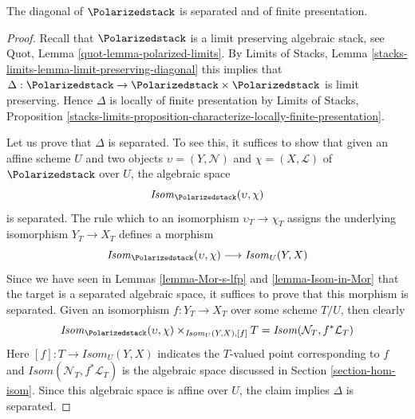 %
\begin{lemma}
\label{lemma-polarized-diagonal-separated-fp}
The diagonal of $\Polarizedstack$ is separated
and of finite presentation.
\end{lemma}

\begin{proof}
Recall that $\Polarizedstack$ is a limit preserving algebraic stack, see
Quot, Lemma \ref{quot-lemma-polarized-limits}.
By Limits of Stacks, Lemma \ref{stacks-limits-lemma-limit-preserving-diagonal}
this implies that
$\Delta : \Polarizedstack \to \Polarizedstack \times \Polarizedstack$
is limit preserving. Hence $\Delta$ is locally of finite presentation
by Limits of Stacks, Proposition
\ref{stacks-limits-proposition-characterize-locally-finite-presentation}.

\medskip\noindent
Let us prove that $\Delta$ is separated. To see this, it suffices to show
that given an affine scheme $U$ and two objects
$\upsilon = (Y, \mathcal{N})$ and $\chi = (X, \mathcal{L})$
of $\Polarizedstack$ over $U$, the algebraic
space
$$
\mathit{Isom}_{\Polarizedstack}(\upsilon, \chi)
$$
is separated. The rule which to an isomorphism $\upsilon_T \to \chi_T$
assigns the underlying isomorphism $Y_T \to X_T$ defines a morphism
$$
\mathit{Isom}_{\Polarizedstack}(\upsilon, \chi)
\longrightarrow
\mathit{Isom}_U(Y, X)
$$
Since we have seen in Lemmas \ref{lemma-Mor-s-lfp} and
\ref{lemma-Isom-in-Mor} that the target is
a separated algebraic space, it suffices to prove that this morphism
is separated. Given an isomorphism $f : Y_T \to X_T$
over some scheme $T/U$, then clearly
$$
\mathit{Isom}_{\Polarizedstack}(\upsilon, \chi)
\times_{\mathit{Isom}_U(Y, X), [f]} T
=
\mathit{Isom}(\mathcal{N}_T, f^*\mathcal{L}_T)
$$
Here $[f] : T \to \mathit{Isom}_U(Y, X)$ indicates the $T$-valued
point corresponding to $f$ and
$\mathit{Isom}(\mathcal{N}_T, f^*\mathcal{L}_T)$
is the algebraic space discussed in Section \ref{section-hom-isom}.
Since this algebraic space is affine over $U$, the claim implies
$\Delta$ is separated.


\end{proof}
